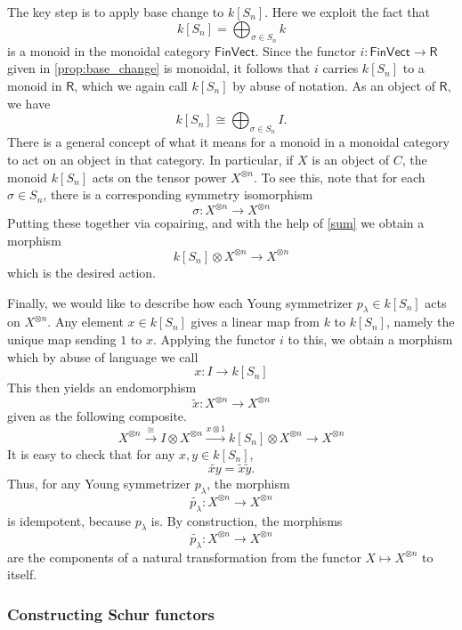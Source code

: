 \documentclass[12pt,reqno]{amsart}
\theoremstyle{plain}
\theoremstyle{definition}
\theoremstyle{remark}
\newcommand{\maps}{\colon}
\newcommand{\category}[1]{\mathsf{#1}}
\newcommand{\R}{\category R}
\newcommand{\namedcat}[1]{\mathsf{#1}}
\newcommand{\Vect}{\namedcat{Vect}}
\newcommand{\Fin}{\namedcat{Fin}}
\numberwithin{thm}{section}
\begin{document}
The key step is to apply base change to $k[S_n]$. Here we exploit the fact that
\[   
    k[S_n] = \bigoplus_{\sigma \in S_n}  k 
\]
is a monoid in the monoidal category $\Fin\Vect$. Since the functor $i \maps \Fin\Vect \to \R$ given in \cref{prop:base_change} is monoidal, it follows that $i$ carries $k[S_n]$ to a monoid in $\R$, which we again call $k[S_n]$ by abuse of notation. As an object of $\R$, we have
\begin{equation}
    k[S_n] \cong \bigoplus_{\sigma \in S_n}  I . \label{sum} 
\end{equation}
There is a general concept of what it means for a monoid in a monoidal category to act on an object in that category. In particular, if $X$ is an object of $C$, the monoid $k[S_n]$ acts on the tensor power $X^{\otimes n}$. To see this, note that for each $\sigma \in S_n$, there is a corresponding symmetry isomorphism 
\[ 
    \sigma \maps X^{\otimes n} \to X^{\otimes n} 
\]
Putting these together via copairing, and with the help of \cref{sum} we obtain a morphism
\[
    k[S_n] \otimes X^{\otimes n} \to X^{\otimes n} 
\]
which is the desired action.

Finally, we would like to describe how each Young symmetrizer $p_\lambda \in k[S_n]$ acts on $X^{\otimes n}$. Any  element $x \in k[S_n]$ gives a linear map from $k$ to $k[S_n]$, namely the unique map sending $1$ to $x$. Applying the functor $i$ to this, we obtain a morphism which by abuse of language we call
\[ 
    x \maps I \to k[S_n] 
\]
This then yields an endomorphism 
\[ 
    \widetilde{x} \maps X^{\otimes n} \to X^{\otimes n } 
\]
given as the following composite.
\[ 
    X^{\otimes n} \xrightarrow{\cong} I \otimes X^{\otimes n} \xrightarrow{x \otimes 1} k[S_n] \otimes X^{\otimes n} \longrightarrow X^{\otimes n} 
\]
It is easy to check that for any $x, y \in k[S_n]$, 
\[ 
    \widetilde{x y} = \widetilde{x} \widetilde{y} .
\]
Thus, for any Young symmetrizer $p_\lambda$, the morphism
\[ 
    \widetilde{p_\lambda} \maps X^{\otimes n} \to X^{\otimes n} 
\]
is idempotent, because $p_\lambda$ is. By construction, the morphisms
\[ 
    \widetilde{p_\lambda} \maps X^{\otimes n} \to X^{\otimes n} 
\]
are the components of a natural transformation from the functor $X \mapsto X^{\otimes n}$ to itself. 

\subsubsection{Constructing Schur functors}
\label{sec:constructing}
\end{document}
